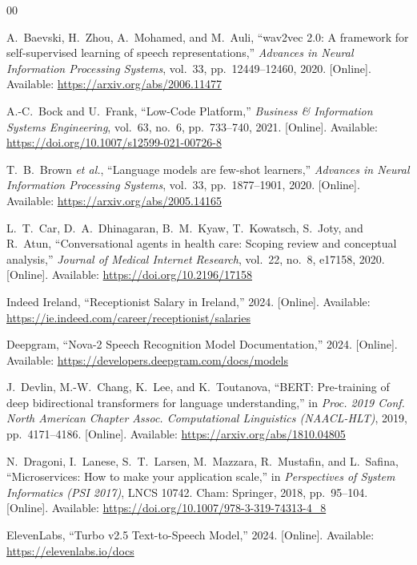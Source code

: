 \documentclass[conference]{IEEEtran}
\begin{document}
\begin{thebibliography}{00}

 A.~Baevski, H.~Zhou, A.~Mohamed, and M.~Auli, ``wav2vec 2.0: A framework for self-supervised learning of speech representations,'' \textit{Advances in Neural Information Processing Systems}, vol.~33, pp.~12449--12460, 2020. [Online]. Available: \url{https://arxiv.org/abs/2006.11477}

 A.-C.~Bock and U.~Frank, ``Low-Code Platform,'' \textit{Business \& Information Systems Engineering}, vol.~63, no.~6, pp.~733--740, 2021. [Online]. Available: \url{https://doi.org/10.1007/s12599-021-00726-8}

 T.~B.~Brown \textit{et al.}, ``Language models are few-shot learners,'' \textit{Advances in Neural Information Processing Systems}, vol.~33, pp.~1877--1901, 2020. [Online]. Available: \url{https://arxiv.org/abs/2005.14165}

 L.~T.~Car, D.~A.~Dhinagaran, B.~M.~Kyaw, T.~Kowatsch, S.~Joty, and R.~Atun, ``Conversational agents in health care: Scoping review and conceptual analysis,'' \textit{Journal of Medical Internet Research}, vol.~22, no.~8, e17158, 2020. [Online]. Available: \url{https://doi.org/10.2196/17158}

 Indeed Ireland, ``Receptionist Salary in Ireland,'' 2024. [Online]. Available: \url{https://ie.indeed.com/career/receptionist/salaries}

 Deepgram, ``Nova-2 Speech Recognition Model Documentation,'' 2024. [Online]. Available: \url{https://developers.deepgram.com/docs/models}

 J.~Devlin, M.-W.~Chang, K.~Lee, and K.~Toutanova, ``BERT: Pre-training of deep bidirectional transformers for language understanding,'' in \textit{Proc. 2019 Conf. North American Chapter Assoc. Computational Linguistics (NAACL-HLT)}, 2019, pp.~4171--4186. [Online]. Available: \url{https://arxiv.org/abs/1810.04805}

 N.~Dragoni, I.~Lanese, S.~T.~Larsen, M.~Mazzara, R.~Mustafin, and L.~Safina, ``Microservices: How to make your application scale,'' in \textit{Perspectives of System Informatics (PSI 2017)}, LNCS 10742. Cham: Springer, 2018, pp.~95--104. [Online]. Available: \url{https://doi.org/10.1007/978-3-319-74313-4_8}

 ElevenLabs, ``Turbo v2.5 Text-to-Speech Model,'' 2024. [Online]. Available: \url{https://elevenlabs.io/docs}


\end{thebibliography}
\end{document}
